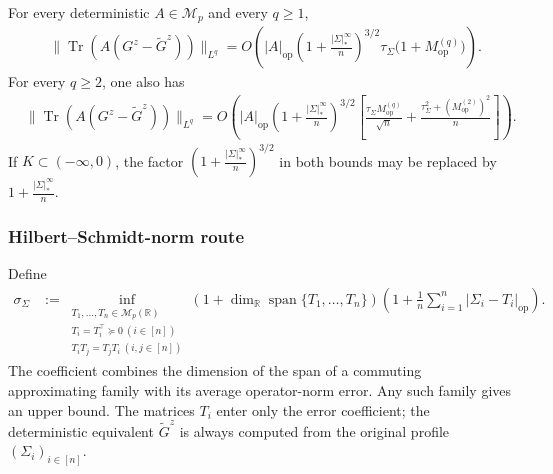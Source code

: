 \documentclass[EJP, preprint, NODS, nobera, nofontexpansion]{ejpecp}
\DeclareMathOperator{\op}{op}
\DeclareMathOperator{\tr}{Tr}
\begin{document}
\begin{theorem}
\label{the:operator_profile_comparison}
For every deterministic $A\in\mathcal M_p$ and every $q\geq1$,
\begin{align}
 &\|\tr(A(G^z-\tilde G^z))\|_{L^q}
 =O\left(|A|_{\op}
 \left(1+\frac{|\Sigma|_*^\infty}n\right)^{3/2}
 \tau_\Sigma\bigl(1+M_{\op}^{(q)}\bigr)\right).
\end{align}
For every $q\geq2$, one also has
\begin{align}
 &\|\tr(A(G^z-\tilde G^z))\|_{L^q}
 =O\left(|A|_{\op}
 \left(1+\frac{|\Sigma|_*^\infty}n\right)^{3/2}\left[
 \frac{\tau_\Sigma M_{\op}^{(q)}}{\sqrt n}
 +\frac{\tau_\Sigma^2+(M_{\op}^{(2)})^2}{n}
 \right]\right).
\end{align}
If $K\subset(-\infty,0)$, the factor
$\left(1+\frac{|\Sigma|_*^\infty}{n}\right)^{3/2}$ in both bounds may be
replaced by $1+\frac{|\Sigma|_*^\infty}{n}$.
\end{theorem}


\subsubsection{Hilbert--Schmidt-norm route}
\label{sssec:main_hs_route}
Define
\begin{align}\label{eq:def_sigma_profile}
    \sigma_\Sigma
    &:={}
    \inf_{\substack{
        T_1,\ldots,T_n\in\mathcal M_p(\mathbb R)\\
        T_i=T_i^\top\succeq0\ (i\in[n])\\
        T_iT_j=T_jT_i\ (i,j\in[n])
    }}
    \left(
        1+\dim_{\mathbb R}
        \operatorname{span}\{T_1,\ldots,T_n\}
    \right)
    \left(
        1+\frac1n\sum_{i=1}^n|\Sigma_i-T_i|_{\op}
    \right).
\end{align}
The coefficient combines the dimension of the span of a commuting approximating family 
with its average operator-norm error.  Any such family gives an
upper bound.
The matrices $T_i$ enter only the error coefficient; the
deterministic equivalent $\tilde G^z$ is always computed
from the original profile $(\Sigma_i)_{i\in[n]}$.
\end{document}
